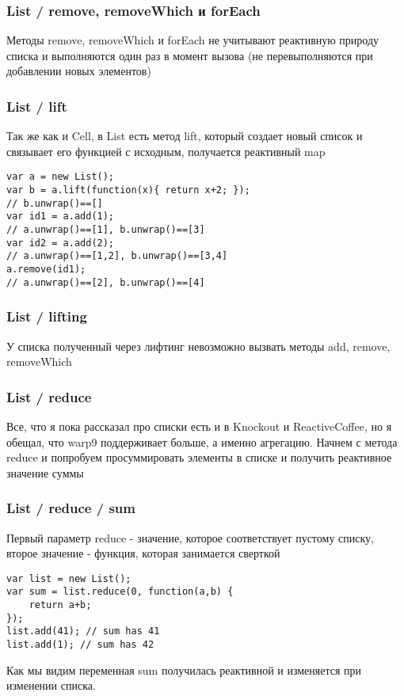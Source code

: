 \documentclass[xetex]{beamer}
\begin{document}
\begin{frame}[fragile]
\frametitle{List / remove, removeWhich и forEach}
Методы remove, removeWhich и forEach не учитывают реактивную природу списка и выполняются один раз в момент вызова (не перевыполняются при добавлении новых элементов)
\end{frame}


\begin{frame}[fragile]
\frametitle{List / lift}
Так же как и Cell, в List есть метод lift, который создает новый список и связывает его функцией с исходным, получается реактивный map

\vspace{6mm}
\lstset{
  xleftmargin=.03\textwidth, xrightmargin=.03\textwidth
}
\begin{lstlisting}
var a = new List(); 
var b = a.lift(function(x){ return x+2; }); 
// b.unwrap()==[]
var id1 = a.add(1); 
// a.unwrap()==[1], b.unwrap()==[3]
var id2 = a.add(2); 
// a.unwrap()==[1,2], b.unwrap()==[3,4]
a.remove(id1); 
// a.unwrap()==[2], b.unwrap()==[4]
\end{lstlisting}
\end{frame}


\begin{frame}[fragile]
\frametitle{List / lifting}
У списка полученный через лифтинг невозможно вызвать методы add, remove, removeWhich
\end{frame}


\begin{frame}[fragile]
\frametitle{List / reduce}
Все, что я пока рассказал про списки есть и в Knockout и ReactiveCoffee, но я обещал, что warp9 поддерживает больше, а именно агрегацию. Начнем с метода reduce и попробуем просуммировать элементы в списке и получить реактивное значение суммы
\end{frame}


\lstset{
  xleftmargin=.05\textwidth, xrightmargin=.05\textwidth
}


\begin{frame}[fragile]
\frametitle{List / reduce / sum}
Первый параметр reduce - значение, которое соответствует пустому списку, второе значение - функция, которая занимается сверткой
\vspace{4mm}
\begin{lstlisting}
var list = new List();
var sum = list.reduce(0, function(a,b) { 
    return a+b; 
});
list.add(41); // sum has 41
list.add(1); // sum has 42
\end{lstlisting}
\vspace{4mm}
Как мы видим переменная sum получилась реактивной и изменяется при изменении списка. 
\end{frame}
\end{document}
